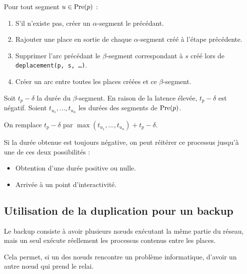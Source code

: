 Pour tout segment $u \in \operatorname{Pre}(p)$ : 
\begin{enumerate}
\item S'il n'existe pas, créer un $\alpha$-segment le précédant.
\item Rajouter une place en sortie de chaque $\alpha$-segment créé à l'étape précédente.
\item Supprimer l'arc précédant le $\beta$-segment correspondant à $s$ créé lors de \texttt{deplacement(p, s, \dots)}.
\item Créer un arc entre toutes les places créées et ce $\beta$-segment.
\end{enumerate}
Soit $t_p - \delta$ la durée du $\beta$-segment. En raison de la latence élevée, $t_p - \delta$ est négatif. Soient $t_{u_1}, ..., t_{u_n}$ les durées des segments de $\operatorname{Pre}(p)$.

On remplace $t_p - \delta$ par $\max(t_{u_1}, ..., t_{u_n}) + t_p - \delta$.

Si la durée obtenue est toujours négative, on peut réitérer ce processus jusqu'à une de ces deux possibilités : 

\begin{itemize}
\item Obtention d'une durée positive ou nulle.
\item Arrivée à un point d'interactivité.
\end{itemize}

\subsection{Utilisation de la duplication pour un backup}
Le backup consiste à avoir plusieurs nœuds exécutant la même partie du réseau, mais un seul exécute réellement les processus contenus entre les places.

Cela permet, si un des nœuds rencontre un problème informatique, d'avoir un autre nœud qui prend le relai.

